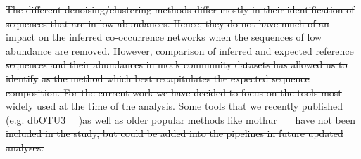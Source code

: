 \documentclass[letterpaper,12pt]{article}
\providecommand{\DIFdeltex}[1]{{\protect\color{red}\sout{#1}}}                      %
\providecommand{\DIFdel}[1]{\texorpdfstring{\DIFdeltex{#1}}{}} %
\begin{document}
\DIFdel{The different denoising/clustering methods differ mostly in their identification of sequences that are in low abundances.
  Hence, they do not have much of an impact on the inferred co-occurrence networks when the sequences of low abundance are removed.
  However, comparison of inferred and expected reference sequences and their abundances in mock community datasets has allowed us to identify }%
\DIFdel{as the method which best recapitulates the expected sequence composition.
  For the current work we have decided to focus on the tools most widely used at the time of the analysis.
  Some tools that we recently published (e.g. dbOTU3~\mbox{%
\cite{Olesen2017}}\hskip0pt%
)as well as older popular methods like mothur~\mbox{%
\cite{Schloss2009} }\hskip0pt%
have not been included in the study, but could be added into the pipelines in future updated analyses.
  }%
\end{document}
